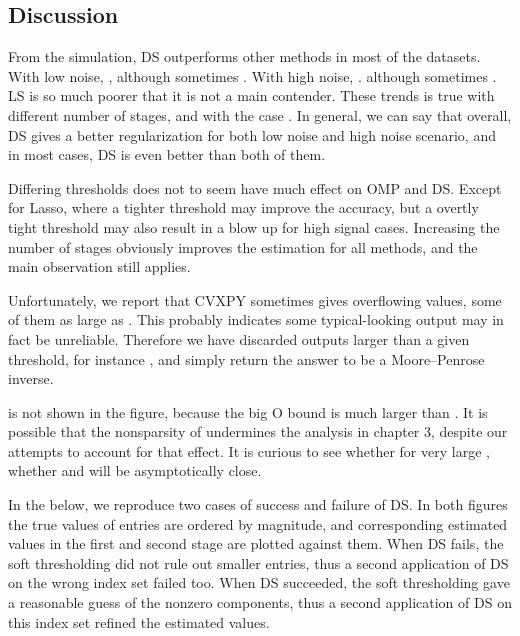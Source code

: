 \subsection {Discussion}

From the simulation, DS outperforms other methods in most of the datasets.
With low noise, ,
although sometimes .
With high noise, .
although sometimes .
LS is so much poorer that it is not a main contender.
These trends is true with different number of stages, and with the case .
In general, we can say that overall, DS gives a better regularization for both low noise and high noise scenario, and in most cases, DS is even better than both of them.

Differing thresholds does not to seem have much effect on OMP and DS.
Except for Lasso, where a tighter threshold may improve the accuracy, but a overtly tight threshold may also result in a blow up for high signal cases.
Increasing the number of stages obviously improves the estimation for all methods, and the main observation still applies.

Unfortunately, we report that CVXPY sometimes gives overflowing values, some of them as large as .
This probably indicates some typical-looking output may in fact be unreliable.
Therefore we have discarded outputs larger than a given threshold, for instance , and simply return the answer to be a Moore–Penrose inverse.

\m {\chi} is not shown in the figure, because the big O bound is much larger than \m {\tilde {\chi}}.
It is possible that the nonsparsity of  undermines the analysis in chapter 3, despite our attempts to account for that effect.
It is curious to see whether for very large , whether \m {\tilde {\chi}} and \m {\chi} will be asymptotically close.

In the below, we reproduce two cases of success and failure of DS.
In both figures the true values of  entries are ordered by magnitude, and corresponding estimated values in the first and second stage are plotted against them.
When DS fails, the soft thresholding did not rule out smaller entries, thus a second application of DS on the wrong index set failed too.
When DS succeeded, the soft thresholding gave a reasonable guess of the nonzero components, thus a second application of DS on this index set refined the estimated values.


